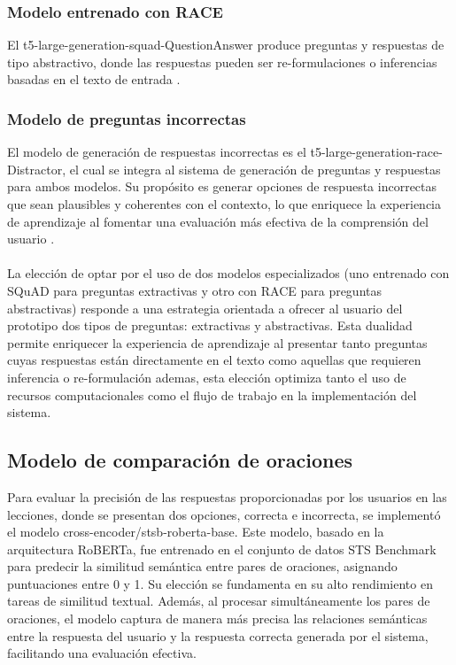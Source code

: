\subsubsection {Modelo entrenado con RACE} El t5-large-generation-squad-QuestionAnswer produce preguntas y respuestas de tipo abstractivo, donde las respuestas pueden ser re-formulaciones o inferencias basadas en el texto de entrada \cite{potsaweerace}.

\subsubsection {Modelo de preguntas incorrectas}
El modelo de generación de respuestas incorrectas es el t5-large-generation-race-Distractor, el cual se integra al sistema de generación de preguntas y respuestas para ambos modelos. Su propósito es generar opciones de respuesta incorrectas que sean plausibles y coherentes con el contexto, lo que enriquece la experiencia de aprendizaje al fomentar una evaluación más efectiva de la comprensión del usuario \cite{potsaweedistractor}.
\\
\\
La elección de optar por el uso de dos modelos especializados (uno entrenado con SQuAD para preguntas extractivas y otro con RACE para preguntas abstractivas) responde a una estrategia orientada a ofrecer al usuario del prototipo dos tipos de preguntas: extractivas y abstractivas. Esta dualidad permite enriquecer la experiencia de aprendizaje al presentar tanto preguntas cuyas respuestas están directamente en el texto como aquellas que requieren inferencia o re-formulación ademas, esta elección optimiza tanto el uso de recursos computacionales como el flujo de trabajo en la implementación del sistema.


\subsection{Modelo de comparación de oraciones}

Para evaluar la precisión de las respuestas proporcionadas por los usuarios en las lecciones, donde se presentan dos opciones, correcta e incorrecta, se implementó el modelo cross-encoder/stsb-roberta-base. Este modelo, basado en la arquitectura RoBERTa, fue entrenado en el conjunto de datos STS Benchmark para predecir la similitud semántica entre pares de oraciones, asignando puntuaciones entre 0 y 1. \cite{stsbrobertabase} Su elección se fundamenta en su alto rendimiento en tareas de similitud textual. Además, al procesar simultáneamente los pares de oraciones, el modelo captura de manera más precisa las relaciones semánticas entre la respuesta del usuario y la respuesta correcta generada por el sistema, facilitando una evaluación efectiva.

